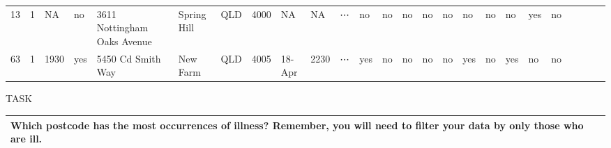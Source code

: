 \documentclass[11pt]{article}
\begin{document}
\begin{tabular}{r|llllllllllllllllllllllll}
	 13                          & 1                           &   NA                        & no                          & 3611 Nottingham Oaks Avenue &  Spring Hill                &  QLD                        &  4000                       & NA                          &   NA                        & ⋯                           & no                          & no                          & no                          & no                          & no                          & no                          & no                          & no                          & yes                         & no                         \\
	 63                          & 1                           & 1930                        & yes                         & 5450 Cd Smith Way           &  New Farm                   &  QLD                        &  4005                       & 18-Apr                      & 2230                        & ⋯                           & yes                         & no                          & no                          & no                          & no                          & yes                         & no                          & yes                         & no                          & no                         \\
\end{tabular}


    
    \textbar{}

TASK

\begin{longtable}[]{@{}l@{}}
\toprule
\begin{minipage}[t]{0.07\columnwidth}\raggedright\strut
Which postcode has the most occurrences of illness? Remember, you will
need to filter your data by only those who are ill.\strut
\end{minipage}\tabularnewline
\bottomrule
\end{longtable}
\end{document}
